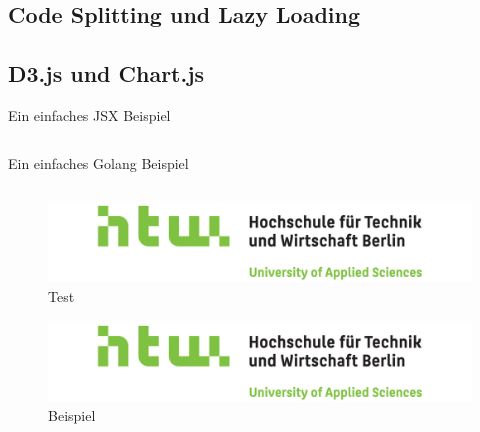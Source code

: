 \subsection{Code Splitting und Lazy Loading}
\subsection{D3.js und Chart.js}
\begin{listing}
    \label{lst:HelloJSX}
    \caption{Ein einfaches JSX Beispiel}
    \inputminted{jsx}{snippets/examples/Welcome.jsx}
\end{listing}

\begin{listing}
    \label{lst:Golang}
    \caption{Ein einfaches Golang Beispiel}
    \inputminted{go}{snippets/examples/hello.go}
\end{listing}

\newpage

\begin{figure}
    \label{figure:test}
    \includegraphics[scale=0.2]{img/HTW}
    \caption{Test}
\end{figure}

\begin{figure}
    \label{figure:beispiel}
    \includegraphics[scale=0.2]{img/HTW}
    \caption{Beispiel}
\end{figure}
